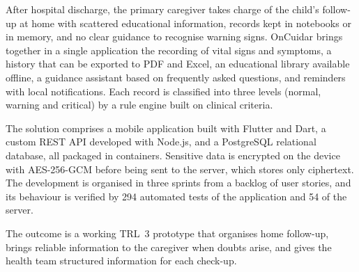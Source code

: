 \documentclass[11pt,letterpaper]{report}
\begin{document}
After hospital discharge, the primary caregiver takes charge of the child's
follow-up at home with scattered educational information, records kept in
notebooks or in memory, and no clear guidance to recognise warning signs.
OnCuidar brings together in a single application the recording of vital signs and
symptoms, a history that can be exported to PDF and Excel, an educational library
available offline, a guidance assistant based on frequently asked questions, and
reminders with local notifications. Each record is classified into three levels
(normal, warning and critical) by a rule engine built on clinical criteria.

The solution comprises a mobile application built with Flutter and Dart, a
custom REST API developed with Node.js, and a PostgreSQL relational database,
all packaged in containers. Sensitive data is encrypted on the device with
AES-256-GCM before being sent to the server, which stores only ciphertext. The
development is organised in three sprints from a backlog of user stories, and
its behaviour is verified by 294 automated tests of the application and 54 of
the server.

The outcome is a working TRL~3 prototype that organises home follow-up, brings
reliable information to the caregiver when doubts arise, and gives the health
team structured information for each check-up.

\clearpage

\setcounter{tocdepth}{2}
\tableofcontents
\newpage

\setcounter{tocdepth}{2}
\listoftables
\newpage

\setcounter{tocdepth}{2}
\listoffigures

\clearpage
{}

\end{document}
